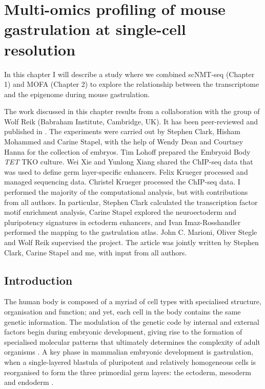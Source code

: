 \graphicspath{{Chapter3/Figs/}}

\chapter{Multi-omics profiling of mouse gastrulation at single-cell resolution}

In this chapter I will describe a study where we combined scNMT-seq (Chapter 1) and MOFA (Chapter 2) to explore the relationship between the transcriptome and the epigenome during mouse gastrulation.

The work discussed in this chapter results from a collaboration with the group of Wolf Reik (Babraham Institute, Cambridge, UK). It has been peer-reviewed and published in \cite{Argelaguet2019}. The experiments were carried out by Stephen Clark, Hisham Mohammed and Carine Stapel, with the help of Wendy Dean and Courtney Hanna for the collection of embryos. Tim Lohoff prepared the Embryoid Body \textit{TET} TKO culture. Wei Xie and Yunlong Xiang shared the ChIP-seq data that was used to define germ layer-specific enhancers. Felix Krueger processed and managed sequencing data. Christel Krueger processed the ChIP-seq data. I performed the majority of the computational analysis, but with contributions from all authors. In particular, Stephen Clark calculated the transcription factor motif enrichment analysis, Carine Stapel explored the neuroectoderm and pluripotency signatures in ectoderm enhancers, and Ivan Imaz-Rosshandler performed the mapping to the gastrulation atlas. John C. Marioni, Oliver Stegle and Wolf Reik supervised the project. The article was jointly written by Stephen Clark, Carine Stapel and me, with input from all authors.

\section{Introduction}

The human body is composed of a myriad of cell types with specialised structure, organisation and function; and yet, each cell in the body contains the same genetic information. The modulation of the genetic code by internal and external factors begin during embryonic development, giving rise to the formation of specialised molecular patterns that ultimately determines the complexity of adult organisms \cite{Rosalind2018}. A key phase in mammalian embryonic development is gastrulation, when a single-layered blastula of pluripotent and relatively homogeneous cells is reorganised to form the three primordial germ layers: the ectoderm, mesoderm and endoderm \cite{Tam1997, Solnica-Krezel2012, Tam2007}.

